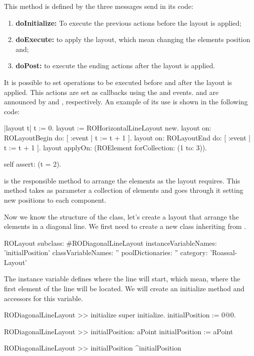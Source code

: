 \documentclass[a4paper,10pt,twoside]{book}
\begin{document}
This method is defined by the three messages send in its code:

\begin{enumerate}

\item \textbf{doInitialize:} To execute the previous actions before the layout is applied;
\item \textbf{doExecute:} to apply the layout, which mean changing the elements position and;
\item \textbf{doPost:} to execute the ending actions after the layout is applied.
\end{enumerate}

It is possible to set operations to be executed before and after the layout is applied. This actions are set as callbacks using the  and  events.
 and  are announced by  and , respectively.
An example of its use is shown in the following code:

\begin{code}{}
|layout t|
t := 0.
layout := ROHorizontalLineLayout new.
layout on: ROLayoutBegin do: [ :event | t := t + 1 ].
layout on: ROLayoutEnd do: [ :event | t := t + 1 ].
layout applyOn: (ROElement forCollection: (1 to: 3)).

self assert: (t = 2).
\end{code}

 is the responsible method to arrange the elements as the layout requires. This method takes as parameter a collection of elements and goes through it setting new positions to each component.

Now we know the structure of the  class, let's create a layout that arrange the elements in a diagonal line.
We first need to create a new class inheriting from . 

\begin{code}{}
ROLayout subclass: #RODiagonalLineLayout
	instanceVariableNames: 'initialPosition'
	classVariableNames: ''
	poolDictionaries: ''
	category: 'Roassal-Layout'
\end{code}

The instance variable  defines where the line will start, which mean, where the first element of the line will be located. We will create an initialize method and accessors for this variable.

\begin{code}{}
RODiagonalLineLayout >> initialize
	super initialize.
	initialPosition := 0@0.
	
RODiagonalLineLayout >> initialPosition: aPoint
	initialPosition := aPoint
	
RODiagonalLineLayout >> initialPosition
	^initialPosition
\end{code}
\end{document}
